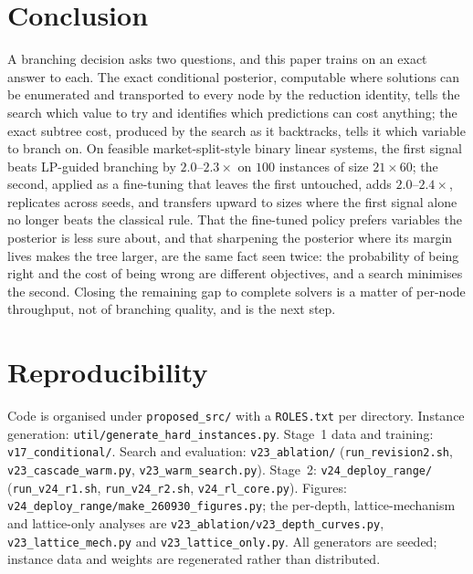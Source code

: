 \documentclass[final,5p,times,twocolumn,authoryear]{elsarticle}
\begin{document}
\section{Conclusion}
\label{sec:conclusion}

A branching decision asks two questions, and this paper trains on an exact answer to each. The exact conditional posterior, computable where solutions can be enumerated and transported to every node by the reduction identity, tells the search which value to try and identifies which predictions can cost anything; the exact subtree cost, produced by the search as it backtracks, tells it which variable to branch on. On feasible market-split-style binary linear systems, the first signal beats LP-guided branching by $2.0$--$2.3\times$ on $100$ instances of size $21\times60$; the second, applied as a fine-tuning that leaves the first untouched, adds $2.0$--$2.4\times$, replicates across seeds, and transfers upward to sizes where the first signal alone no longer beats the classical rule. That the fine-tuned policy prefers variables the posterior is less sure about, and that sharpening the posterior where its margin lives makes the tree larger, are the same fact seen twice: the probability of being right and the cost of being wrong are different objectives, and a search minimises the second. Closing the remaining gap to complete solvers is a matter of per-node throughput, not of branching quality, and is the next step.

\section*{Reproducibility}
Code is organised under \texttt{proposed\_src/} with a \texttt{ROLES.txt} per directory. Instance generation: \texttt{util/generate\_hard\_instances.py}. Stage~1 data and training: \texttt{v17\_conditional/}. Search and evaluation: \texttt{v23\_ablation/} (\texttt{run\_revision2.sh}, \texttt{v23\_cascade\_warm.py}, \texttt{v23\_warm\_search.py}). Stage~2: \texttt{v24\_deploy\_range/} (\texttt{run\_v24\_r1.sh}, \texttt{run\_v24\_r2.sh}, \texttt{v24\_rl\_core.py}). Figures: \texttt{v24\_deploy\_range/make\_260930\_figures.py}; the per-depth, lattice-mechanism and lattice-only analyses are \texttt{v23\_ablation/v23\_depth\_curves.py}, \texttt{v23\_lattice\_mech.py} and \texttt{v23\_lattice\_only.py}. All generators are seeded; instance data and weights are regenerated rather than distributed.



\end{document}
